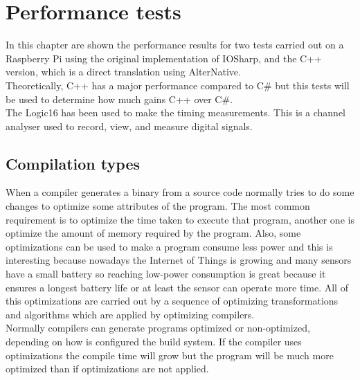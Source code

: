 \chapter{Performance tests}\label{C:Performance-Test}
In this chapter are shown the performance results for two tests carried out on a Raspberry Pi using the original implementation of IOSharp, and the C++ version, which is a direct translation using AlterNative.
\\
Theoretically, C++ has a major performance compared to C\# but this tests will be used to determine how much gains C++  over C\#.
\\
The Logic16 has been used to make the timing measurements. This is a channel analyser used to record, view, and measure digital signals.

\section{Compilation types}\label{S:PERF-comptypes}
When a compiler generates a binary from a source code normally tries to do some changes to optimize some attributes of the program. The most common requirement is to optimize the time taken to execute that program, another one is optimize the amount of memory required by the program. Also, some optimizations can be used to make a program consume less power and this is interesting because nowadays the Internet of Things is growing and many sensors have a small battery so reaching low-power consumption is great because it ensures a longest battery life or at least the sensor can operate more time. All of this optimizations are carried out by a sequence of optimizing transformations and algorithms which are applied by optimizing compilers.
\\
Normally compilers can generate programs optimized or non-optimized, depending on how is configured the build system. If the compiler uses optimizations the compile time will grow but the program will be much more optimized than if optimizations are not applied.
